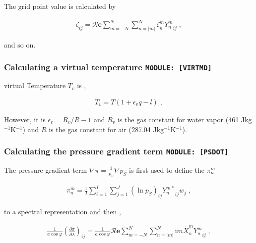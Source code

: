 The grid point value is calculated by

\begin{eqnarray}
  \zeta_{ij}
   =  {\mathcal R}{\mathbf{e}} \sum_{m=-N}^{N} \sum_{n=|m|}^{N}
      \zeta_n^m  {Y_n^m}_{ij} \; ,
\end{eqnarray}

and so on.

\hypertarget{calculating-a-virtual-temperature-module-virtmd}{%
\subsubsection{\texorpdfstring{Calculating a virtual temperature
\texttt{MODULE:\ {[}VIRTMD{]}}}{Calculating a virtual temperature MODULE: {[}VIRTMD{]}}}\label{calculating-a-virtual-temperature-module-virtmd}}

virtual Temperature \(T_v\) is ,

\begin{eqnarray}
  T_v = T ( 1 + \epsilon_v q - l ) \; ,
\end{eqnarray}

However, it is \(\epsilon_v = R_v/R - 1\) and \(R_v\) is the gas
constant for water vapor (461 Jkg\(^{-1}\)K\(^{-1}\)) and \(R\) is the
gas constant for air (287.04 Jkg\(^{-1}\)K\(^{-1}\)).

\hypertarget{calculating-the-pressure-gradient-term-module-psdot}{%
\subsubsection{\texorpdfstring{Calculating the pressure gradient term
\texttt{MODULE:\ {[}PSDOT{]}}}{Calculating the pressure gradient term MODULE: {[}PSDOT{]}}}\label{calculating-the-pressure-gradient-term-module-psdot}}

The pressure gradient term \(\nabla \pi = \frac{1}{p_S} \nabla p_S\) is
first used to define the \(\pi_n^m\)

\begin{eqnarray}
  \pi_n^m  =  \frac{1}{I} \sum_{i=1}^{I} \sum_{j=1}^{J}  
               (\ln {p_S})_{ij} {Y_n^{m *}}_{ij}  w_j \; ,
\end{eqnarray}

to a spectral representation and then ,

\begin{eqnarray}
   \frac{1}{a \cos \varphi}
   \left( \frac{\partial \pi}{\partial \lambda} \right)_{ij}
     =
   \frac{1}{a \cos \varphi}
        {\mathcal R}{\mathbf{e}} \sum_{m=-N}^{N} \sum_{n=|m|}^{N}
       \mathrm{i}m \tilde{X}_n^m {Y_n^m}_{ij}  \; ,
\end{eqnarray}

